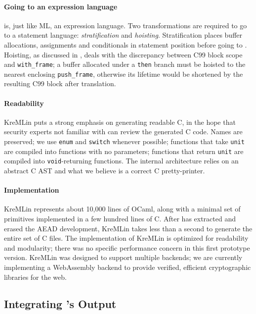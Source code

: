 \documentclass[acmsmall,review,anonymous]{acmart}\settopmatter{printfolios=true}
\let\li\lstinline
\begin{document}
\paragraph{Going to an expression language}
\fstar is, just like ML, an expression language. Two transformations are
required to go to a statement language: \emph{stratification} and
\emph{hoisting}. Stratification places buffer
allocations, assignments and conditionals in statement
position before going to \cstar. Hoisting, as discussed in
, deals with the discrepancy between C99 block scope
and \lowstar \li[language={}]{with_frame}; a buffer allocated under a \li+then+
branch must be hoisted to the nearest enclosing \li+push_frame+,
otherwise its lifetime would be shortened by the resulting C99
block after translation.

\paragraph{Readability}
KreMLin puts a strong emphasis on generating readable C, in the hope that
security experts not familiar with \fstar can review the generated C code.
Names are preserved; we use \li+enum+ and \li+switch+ whenever possible;
functions that take \li+unit+ are compiled into functions with no parameters;
functions that return \li+unit+ are compiled into \li+void+-returning functions.
The internal architecture relies on an abstract C AST and what we believe is a
correct C pretty-printer.

\paragraph{Implementation}
KreMLin represents about 10,000 lines of OCaml, along with a minimal set of
primitives implemented in a few hundred lines of C. After \fstar has extracted and
erased the AEAD development, KreMLin takes less than a second to generate the
entire set of C files. The implementation of KreMLin is optimized for
readability and modularity; there was no specific performance concern in this
first prototype version. KreMLin was designed to support multiple backends; we
are currently implementing a WebAssembly backend to provide verified, efficient
cryptographic libraries for the web.

\subsection{Integrating \kremlin's Output}
\end{document}
